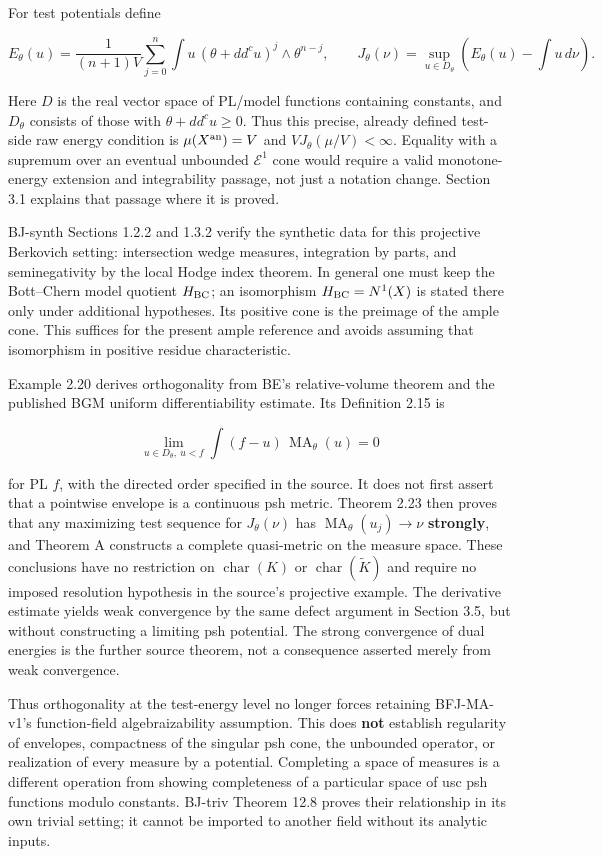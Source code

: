 \documentclass[
  11pt,
]{article}
\begin{document}
For test potentials define

\[E_\theta(u)=\frac1{(n+1)V}\sum_{j=0}^n\int u\,(\theta+dd^cu)^j\wedge\theta^{n-j},\qquad J_\theta(\nu)=\sup_{u\in D_\theta}\left(E_\theta(u)-\int u\,d\nu\right).\]

Here \(D\) is the real vector space of PL/model functions containing
constants, and \(D_\theta\) consists of those with
\(\theta+dd^cu\geq0\). Thus this precise, already defined test-side raw
energy condition is \(\mu(X^{\rm an})=V\) and
\(VJ_\theta(\mu/V)<\infty\). Equality with a supremum over an eventual
unbounded \(\mathcal E^1\) cone would require a valid monotone-energy
extension and integrability passage, not just a notation change. Section
3.1 explains that passage where it is proved.

BJ-synth Sections 1.2.2 and 1.3.2 verify the synthetic data for this
projective Berkovich setting: intersection wedge measures, integration
by parts, and seminegativity by the local Hodge index theorem. In
general one must keep the Bott--Chern model quotient \(H_{\rm BC}\); an
isomorphism \(H_{\rm BC}=N^1(X)\) is stated there only under additional
hypotheses. Its positive cone is the preimage of the ample cone. This
suffices for the present ample reference and avoids assuming that
isomorphism in positive residue characteristic.

Example 2.20 derives orthogonality from BE's relative-volume theorem and
the published BGM uniform differentiability estimate. Its Definition
2.15 is

\[\lim_{u\in D_\theta,\ u<f}\int(f-u)\,\operatorname{MA}_\theta(u)=0\]

for PL \(f\), with the directed order specified in the source. It does
not first assert that a pointwise envelope is a continuous psh metric.
Theorem 2.23 then proves that any maximizing test sequence for
\(J_\theta(\nu)\) has \(\operatorname{MA}_\theta(u_j)\to\nu\)
\textbf{strongly}, and Theorem A constructs a complete quasi-metric on
the measure space. These conclusions have no restriction on
\(\operatorname{char}(K)\) or \(\operatorname{char}(\widetilde K)\) and
require no imposed resolution hypothesis in the source's projective
example. The derivative estimate yields weak convergence by the same
defect argument in Section 3.5, but without constructing a limiting psh
potential. The strong convergence of dual energies is the further source
theorem, not a consequence asserted merely from weak convergence.

Thus orthogonality at the test-energy level no longer forces retaining
BFJ-MA-v1's function-field algebraizability assumption. This does
\textbf{not} establish regularity of envelopes, compactness of the
singular psh cone, the unbounded operator, or realization of every
measure by a potential. Completing a space of measures is a different
operation from showing completeness of a particular space of usc psh
functions modulo constants. BJ-triv Theorem 12.8 proves their
relationship in its own trivial setting; it cannot be imported to
another field without its analytic inputs.
\end{document}

